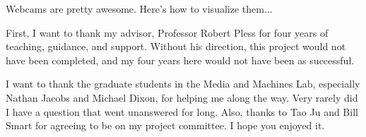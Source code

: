%

\begin{thesistitlepage}               %
\end{thesistitlepage}

\begin{thesisabstract}
Webcams are pretty awesome.  Here's how to visualize them...
\end{thesisabstract}

\begin{thesisacknowledgments}

First, I want to thank my advisor, Professor Robert Pless for four years of teaching, guidance, and support.  Without his direction, this project would not have been completed, and my four years here would not have been as successful.

I want to thank the graduate students in the Media and Machines Lab, especially Nathan Jacobs and Michael Dixon, for helping me along the way.  Very rarely did I have a question that went unanswered for long.  Also, thanks to Tao Ju and Bill Smart for agreeing to be on my project committee.  I hope you enjoyed it.

\end{thesisacknowledgments}


\begin{singlespace}
\tableofcontents



\listoffigures
\end{singlespace}

